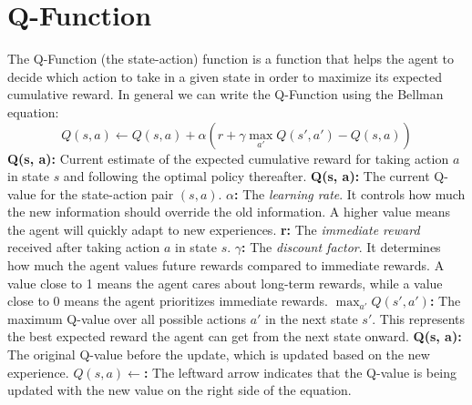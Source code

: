 \section{Q-Function}
The Q-Function (the state-action) function is a function that helps the agent to decide which action to take in a given state in order to maximize  its expected cumulative reward.
In general we can write the Q-Function using the Bellman equation:
\begin{equation}
Q(s, a) \leftarrow Q(s, a) + \alpha \left( r + \gamma \max_{a'} Q(s', a') - Q(s, a) \right)
\label{non_deteministic_q_function}
\end{equation}
\newline
\textbf{Q(s, a):} Current estimate of the expected cumulative reward for taking action \(a\) in state \(s\) and following the optimal policy thereafter.
\newline
\textbf{Q(s, a):} The current Q-value for the state-action pair \( (s, a) \).
\newline
\textbf{\(\alpha\):} The \textit{learning rate}. It controls how much the new information should override the old information. A higher value means the agent will quickly adapt to new experiences.
\newline
\textbf{r:} The \textit{immediate reward} received after taking action \(a\) in state \(s\).
\newline
\textbf{\(\gamma\):} The \textit{discount factor}. It determines how much the agent values future rewards compared to immediate rewards. A value close to 1 means the agent cares about long-term rewards, while a value close to 0 means the agent prioritizes immediate rewards.
\newline
\textbf{\(\max_{a'} Q(s', a')\):} The maximum Q-value over all possible actions \(a'\) in the next state \(s'\). This represents the best expected reward the agent can get from the next state onward.
\newline
\textbf{Q(s, a):} The original Q-value before the update, which is updated based on the new experience.
\newline
\textbf{\(Q(s, a) \leftarrow \):} The leftward arrow indicates that the Q-value is being updated with the new value on the right side of the equation.
